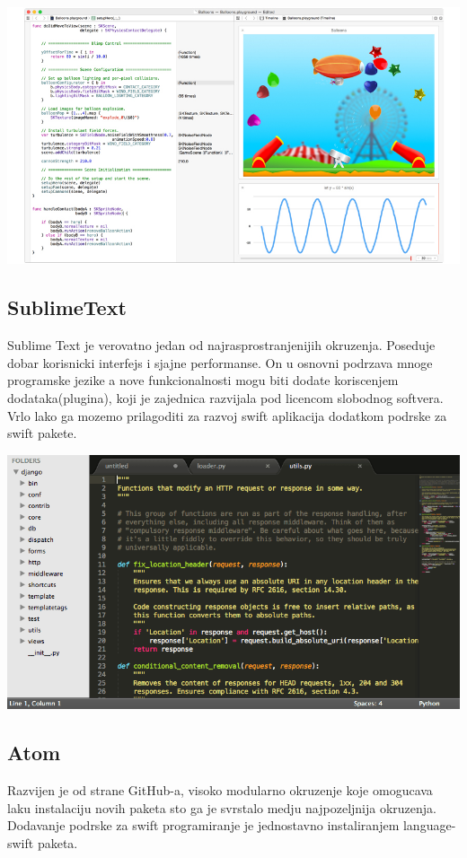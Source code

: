 \documentclass[a4paper]{article}
\begin{document}
\includegraphics[scale=0.2]{playground.jpg}

\subsection{SublimeText}
\label{subsec:podnaslovSublimeText}

\vspace{3mm}

Sublime Text je verovatno jedan od najrasprostranjenijih okruzenja. Poseduje dobar korisnicki interfejs i sjajne performanse. On u osnovni podrzava mnoge programske jezike a nove funkcionalnosti mogu biti dodate koriscenjem dodataka(plugina), koji je zajednica razvijala pod licencom slobodnog softvera. Vrlo lako ga mozemo prilagoditi za razvoj swift aplikacija dodatkom podrske za swift pakete.
\vspace{3mm}


\includegraphics[scale=0.25]{sublime.png}

\subsection{Atom}
\label{subsec:podnaslovAtom}
Razvijen je od strane GitHub-a, visoko modularno okruzenje koje omogucava laku instalaciju novih paketa sto ga je svrstalo medju najpozeljnija okruzenja. Dodavanje podrske za swift programiranje je jednostavno instaliranjem language-swift paketa.
\end{document}
